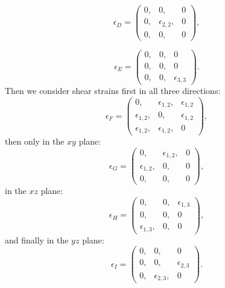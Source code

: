 \documentclass[12pt,a4paper]{article}
\begin{document}
\begin{equation}
\epsilon_D=\left( \begin{array}{ccc}
0, & 0, & 0 
\\
0, &  \epsilon_{2,2}, & 0 
\\
0, & 0, & 0
\end{array}
\right),
\end{equation}

\begin{equation}
\epsilon_E=\left( \begin{array}{ccc}
0, & 0, & 0 
\\
0, & 0, & 0 
\\
0, & 0, & \epsilon_{3,3}
\end{array}
\right).
\end{equation}
Then we consider shear strains first in all three directions:
\begin{equation}
\epsilon_F=\left( \begin{array}{ccc}
0, & \epsilon_{1,2}, & \epsilon_{1,2}
\\
\epsilon_{1,2}, & 0, & \epsilon_{1,2} 
\\
\epsilon_{1,2}, & \epsilon_{1,2}, & 0
\end{array}
\right),
\end{equation}
then only in the $xy$ plane:
\begin{equation}
\epsilon_G=\left( \begin{array}{ccc}
0, & \epsilon_{1,2}, & 0
\\
\epsilon_{1,2}, & 0, & 0
\\
0, & 0, & 0
\end{array}
\right),
\end{equation}
in the $xz$ plane:
\begin{equation}
\epsilon_H=\left( \begin{array}{ccc}
0, & 0, & \epsilon_{1,3}
\\
0, & 0, & 0
\\
\epsilon_{1,3}, & 0, & 0
\end{array}
\right),
\end{equation}
and finally in the $yz$ plane:
\begin{equation}
\epsilon_I=\left( \begin{array}{ccc}
0, & 0, & 0
\\
0, & 0, & \epsilon_{2,3} 
\\
0, & \epsilon_{2,3}, & 0
\end{array}
\right).
\end{equation}
\end{document}

